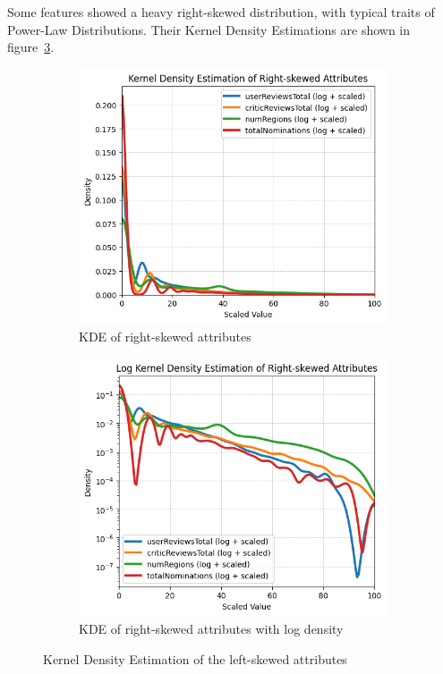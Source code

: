 Some features showed a heavy right-skewed distribution, with typical traits of Power-Law Distributions. Their Kernel Density Estimations are shown in figure~\ref{fig:left_skewed}.
\vspace{1em}
\begin{figure}[H]
    \centering
    \begin{subfigure}{0.48\textwidth}
        \includegraphics[width=\textwidth]{plots/left_skew_distribs.png}
        \captionsetup{width=0.9\linewidth, justification=centering}
        \caption{KDE of right-skewed attributes}
        \label{fig:sub1_KDE_left_skew}
    \end{subfigure}
    \begin{subfigure}{0.48\textwidth}
        \includegraphics[width=\textwidth]{plots/left_skew_distribs_log.png}
        \captionsetup{width=0.9\linewidth, justification=centering}
        \caption{KDE of right-skewed attributes with log density}
        \label{fig:sub2_KDE_left_skew}
    \end{subfigure}
    \caption{Kernel Density Estimation of the left-skewed attributes}
    \label{fig:left_skewed}
\end{figure}

